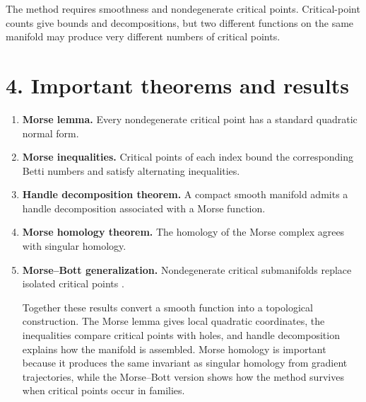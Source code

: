The method requires smoothness and nondegenerate critical points. Critical-point counts give bounds and decompositions, but two different functions on the same manifold may produce very different numbers of critical points.

\section*{4. Important theorems and results}
\begin{enumerate}[leftmargin=*,itemsep=0.35em]
\item \textbf{Morse lemma.} Every nondegenerate critical point has a standard quadratic normal form.

\item \textbf{Morse inequalities.} Critical points of each index bound the corresponding Betti numbers and satisfy alternating inequalities.

\item \textbf{Handle decomposition theorem.} A compact smooth manifold admits a handle decomposition associated with a Morse function.

\item \textbf{Morse homology theorem.} The homology of the Morse complex agrees with singular homology.

\item \textbf{Morse--Bott generalization.} Nondegenerate critical submanifolds replace isolated critical points \cite{morse_theory_ref3}.

Together these results convert a smooth function into a topological construction. The Morse lemma gives local quadratic coordinates, the inequalities compare critical points with holes, and handle decomposition explains how the manifold is assembled. Morse homology is important because it produces the same invariant as singular homology from gradient trajectories, while the Morse--Bott version shows how the method survives when critical points occur in families.
\end{enumerate}

\theoryapplications
{}

